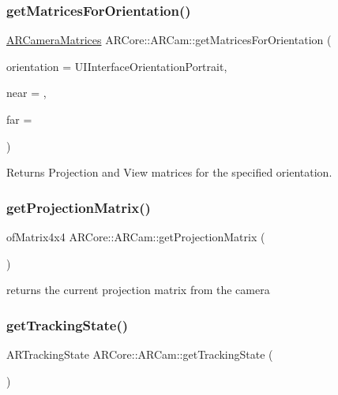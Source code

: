 \subsubsection{\texorpdfstring{get\+Matrices\+For\+Orientation()}{getMatricesForOrientation()}}
{\footnotesize\ttfamily \hyperlink{struct_a_r_common_1_1_a_r_camera_matrices}{A\+R\+Camera\+Matrices} A\+R\+Core\+::\+A\+R\+Cam\+::get\+Matrices\+For\+Orientation (\begin{DoxyParamCaption}\item[{U\+I\+Interface\+Orientation}]{orientation = {\ttfamily UIInterfaceOrientationPortrait},  }\item[{float}]{near = {},  }\item[{float}]{far = {} }\end{DoxyParamCaption})}



Returns Projection and View matrices for the specified orientation. 

\mbox{\label{class_a_r_core_1_1_a_r_cam_a19409c89b0bcbaad62e5d405d194f8a7}} 
\subsubsection{\texorpdfstring{get\+Projection\+Matrix()}{getProjectionMatrix()}}
{\footnotesize\ttfamily of\+Matrix4x4 A\+R\+Core\+::\+A\+R\+Cam\+::get\+Projection\+Matrix (\begin{DoxyParamCaption}{ }\end{DoxyParamCaption})\hspace{0.3cm}{\ttfamily [inline]}}



returns the current projection matrix from the camera 

\mbox{\label{class_a_r_core_1_1_a_r_cam_abef41c0e5914cb2404b26317921d16a1}} 
\subsubsection{\texorpdfstring{get\+Tracking\+State()}{getTrackingState()}}
{\footnotesize\ttfamily A\+R\+Tracking\+State A\+R\+Core\+::\+A\+R\+Cam\+::get\+Tracking\+State (\begin{DoxyParamCaption}{ }\end{DoxyParamCaption})}




